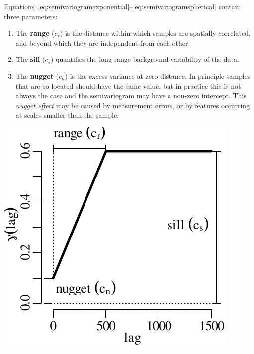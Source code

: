Equations~\ref{eq:semivariogramexponential}--\ref{eq:semivariogramspherical}
contain three parameters:

\begin{enumerate}
\item The \textbf{range} ($c_r$) is the distance within which samples
  are spatially correlated, and beyond which they are independent from
  each other.

\item The \textbf{sill} ($c_s$) quantifies the long range background
  variability of the data.

\item The \textbf{nugget} ($c_n$) is the excess variance at zero
  distance. In principle samples that are co-located should have the
  same value, but in practice this is not always the case and the
  semivariogram may have a non-zero intercept. This \textit{nugget
    effect} may be caused by measurement errors, or by features
  occurring at scales smaller than the sample.
\end{enumerate}

\noindent\begin{minipage}[t][][b]{.35\textwidth}
\includegraphics[width=\textwidth]{../figures/snr.pdf}
\end{minipage}
\begin{minipage}[t][][t]{.65\textwidth}
  \label{fig:snr}
\end{minipage}

